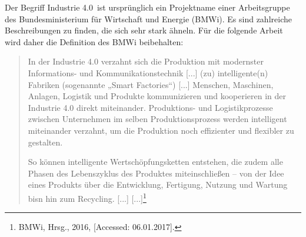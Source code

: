 Der Begriff \frqq Industrie 4.0\flqq\ ist ursprünglich ein Projektname einer Arbeitsgruppe des Bundesministerium für Wirtschaft und Energie (BMWi). Es sind zahlreiche Beschreibungen zu finden, die sich sehr stark ähneln. Für die folgende Arbeit wird daher die Definition des BMWi beibehalten:
\begin{quote}
	\frqq In der Industrie 4.0 verzahnt sich die Produktion mit modernster Informations- und Kommunikationstechnik [...] (zu)
	intelligente(n) Fabriken (sogenannte „Smart Factories“) [...]
	Menschen, Maschinen, Anlagen, Logistik und Produkte kommunizieren und kooperieren in der Industrie 4.0 direkt miteinander. Produktions- und Logistikprozesse zwischen Unternehmen im selben Produktionsprozess werden intelligent miteinander verzahnt, um die Produktion noch effizienter und flexibler zu gestalten.
	
	So können intelligente Wertschöpfungsketten entstehen, die zudem alle Phasen des Lebenszyklus des Produktes miteinschließen -- von der Idee eines Produkts über die Entwicklung, Fertigung, Nutzung und Wartung bisn hin zum Recycling. [...] %
	[...]\flqq\footnote{ BMWi, Hrsg., 2016, [Accessed: 06.01.2017].}
\end{quote}
